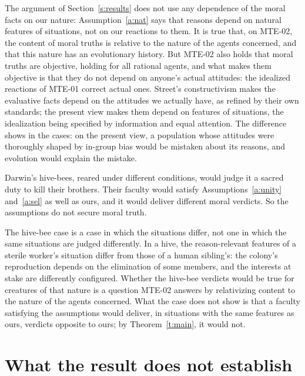 \documentclass{situationist-preprint}
\begin{document}
\begin{reply}
The argument of Section~\ref{s:results} does not use any dependence of the moral facts on our nature: Assumption~\ref{a:nat} says that reasons depend on natural features of situations, not on our reactions to them. It is true that, on MTE-02, the content of moral truths is relative to the nature of the agents concerned, and that this nature has an evolutionary history. But MTE-02 also holds that moral truths are objective, holding for all rational agents, and what makes them objective is that they do not depend on anyone's actual attitudes: the idealized reactions of MTE-01 correct actual ones. Street's constructivism makes the evaluative facts depend on the attitudes we actually have, as refined by their own standards; the present view makes them depend on features of situations, the idealization being specified by information and equal attention. The difference shows in the cases: on the present view, a population whose attitudes were thoroughly shaped by in-group bias would be mistaken about its reasons, and evolution would explain the mistake.
\end{reply}

\begin{objection}
Darwin's hive-bees, reared under different conditions, would judge it a sacred duty to kill their brothers. Their faculty would satisfy Assumptions~\ref{a:unity} and~\ref{a:sel} as well as ours, and it would deliver different moral verdicts. So the assumptions do not secure moral truth.
\end{objection}

\begin{reply}
The hive-bee case is a case in which the situations differ, not one in which the same situations are judged differently. In a hive, the reason-relevant features of a sterile worker's situation differ from those of a human sibling's: the colony's reproduction depends on the elimination of some members, and the interests at stake are differently configured. Whether the hive-bee verdicts would be true for creatures of that nature is a question MTE-02 answers by relativizing content to the nature of the agents concerned. What the case does not show is that a faculty satisfying the assumptions would deliver, in situations with the same features as ours, verdicts opposite to ours; by Theorem~\ref{t:main}, it would not.
\end{reply}

\section{What the result does not establish}
\end{document}
